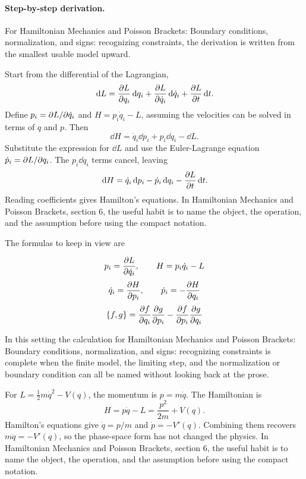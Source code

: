\paragraph{Step-by-step derivation.}

For Hamiltonian Mechanics and Poisson Brackets: Boundary conditions, normalization, and signs: recognizing constraints, the derivation is written from the smallest usable model upward.

Start from the differential of the Lagrangian,
\[
  \,\mathrm d L=\frac{\partial L}{\partial q_i}\,\mathrm d q_i+\frac{\partial L}{\partial\dot q_i}\,\mathrm d\dot q_i+\frac{\partial L}{\partial t}\,\mathrm d t.
\]
Define \(p_i=\partial L/\partial\dot q_i\) and \(H=p_i\dot q_i-L\), assuming the velocities can be solved in terms of \(q\) and \(p\).  Then
\[
  \dd H=\dot q_i\dd p_i+p_i\dd\dot q_i-\dd L.
\]
Substitute the expression for \(\dd L\) and use the Euler-Lagrange equation \(\dot p_i=\partial L/\partial q_i\).  The \(p_i\dd\dot q_i\) terms cancel, leaving
\[
  \,\mathrm d H=\dot q_i\,\mathrm d p_i-\dot p_i\,\mathrm d q_i-\frac{\partial L}{\partial t}\,\mathrm d t.
\]
Reading coefficients gives Hamilton's equations.  In Hamiltonian Mechanics and Poisson Brackets, section 6, the useful habit is to name the object, the operation, and the assumption before using the compact notation.

The formulas to keep in view are

\[
  p_i=\frac{\partial L}{\partial\dot q_i},\qquad H=p_i\dot q_i-L
\]
\[
  \dot q_i=\frac{\partial H}{\partial p_i},\qquad \dot p_i=-\frac{\partial H}{\partial q_i}
\]
\[
  \{f,g\}=\frac{\partial f}{\partial q_i}\frac{\partial g}{\partial p_i}-\frac{\partial f}{\partial p_i}\frac{\partial g}{\partial q_i}
\]

In this setting the calculation for Hamiltonian Mechanics and Poisson Brackets: Boundary conditions, normalization, and signs: recognizing constraints is complete when the finite model, the limiting step, and the normalization or boundary condition can all be named without looking back at the prose.




\begin{example}
For \(L=\frac12m\dot q^2-V(q)\), the momentum is \(p=m\dot q\).  The Hamiltonian is
\[
  H=p\dot q-L=\frac{p^2}{2m}+V(q).
\]
Hamilton's equations give \(\dot q=p/m\) and \(\dot p=-V'(q)\).  Combining them recovers \(m\ddot q=-V'(q)\), so the phase-space form has not changed the physics.  In Hamiltonian Mechanics and Poisson Brackets, section 6, the useful habit is to name the object, the operation, and the assumption before using the compact notation.
\end{example}



